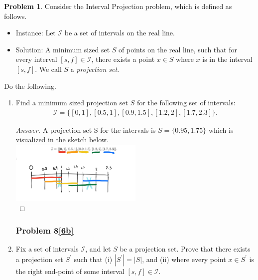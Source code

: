 \documentclass[11pt]{article}
\theoremstyle{definition}
\theoremstyle{definition}
\newtheorem{required}{Problem}
\theoremstyle{definition}
\begin{document}
\begin{required} \label{Exchange2}
Consider the \textsf{Interval Projection} problem, which is defined as follows.
\begin{itemize}
\item \textsf{Instance:} Let $\mathcal{I}$ be a set of intervals on the real line.
\item \textsf{Solution:} A minimum sized set $S$ of points on the real line, such that for every interval $[s, f] \in \mathcal{I}$, there exists a point $x \in S$ where $x$ is in the interval $[s, f]$. We call $S$ a \textit{projection set}.
\end{itemize}

\noindent Do the following.
\begin{enumerate}[label=(\alph*)]
\subsubsection{Problem 8\ref{6a}}
\item \label{6a} Find a minimum sized projection set $S$ for the following set of intervals:
\begin{align*}
\mathcal{I} = \{ [0, 1], [0.5, 1], [0.9, 1.5], [1.2, 2], [1.7, 2.3] \}.
\end{align*}


\begin{proof}[Answer]
A projection set S for the intervals is $S = \{0.95, 1.75\}$ which is visualized in the sketch below.  \\

\includegraphics[width=0.5\textwidth]{problem8} \\

\end{proof}

\newpage
\subsubsection{Problem 8\ref{6b}}
\item \label{6b} Fix a set of intervals $\mathcal{I}$, and let $S$ be a projection set. Prove that there exists a projection set $S^{\prime}$ such that (i) $|S^{\prime}| = |S|$, and (ii) where every point $x \in S^{\prime}$ is the right end-point of some interval $[s, f] \in \mathcal{I}$. 


\end{enumerate}
\end{required}
\end{document}
